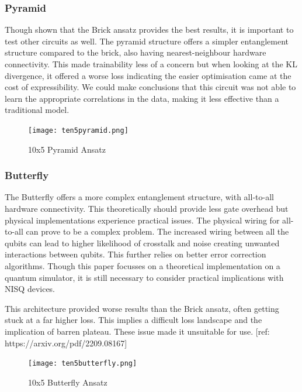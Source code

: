 \documentclass[12pt]{article}
\newcommand{\newp}
    {
    \vskip 0.5cm 
  }
\numberwithin{equation}{section}
\begin{document}
\subsubsection{Pyramid}
Though shown that the Brick ansatz provides the best results, it is important to 
test other circuits as well. The pyramid structure offers a simpler entanglement 
structure compared to the brick, also having nearest-neighbour hardware 
connectivity. This made trainability less of a concern but 
when looking at the KL divergence, it offered a worse loss indicating the 
easier optimisation came at the cost of expressibility. We could make conclusions 
that this circuit was not able to learn the appropriate correlations in the data,
making it less effective than a traditional model. 
\begin{figure}[h!]
  \centering 
  \texttt{[image: ten5pyramid.png]}
  \caption{10x5 Pyramid Ansatz}
  \label{fig:pyramid}
\end{figure}

\newpage
\subsubsection{Butterfly}
The Butterfly offers a more complex entanglement structure, with all-to-all hardware 
connectivity. This theoretically should provide less gate overhead but physical 
implementations experience practical issues. The physical wiring for all-to-all 
can prove to be a complex problem. The increased wiring between all the qubits 
can lead to higher likelihood of crosstalk and noise creating unwanted interactions 
between qubits. This further relies on better error correction algorithms. Though 
this paper focusses on a theoretical implementation on a quantum simulator, it 
is still necessary to consider practical implications with NISQ devices. 
\newp
This architecture provided worse results than the Brick ansatz, often getting 
stuck at a far higher loss. This implies a difficult loss landscape and the 
implication of barren plateau. These issue made it unsuitable for use. 
[ref: https://arxiv.org/pdf/2209.08167]
\begin{figure}[h!]
  \centering 
  \texttt{[image: ten5butterfly.png]}
  \caption{10x5 Butterfly Ansatz}
  \label{fig:butterfly}
\end{figure}
\newpage
\end{document}
